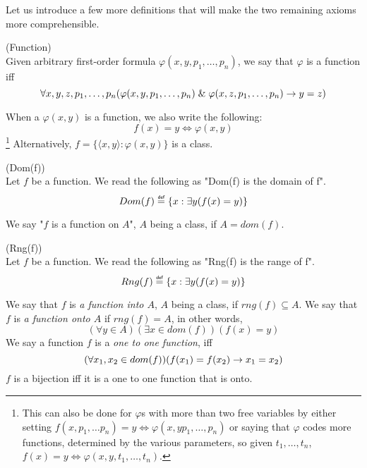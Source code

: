 Let us introduce a few more definitions that will make the two remaining axioms more comprehensible.
\begin{definition}{(Function)}\label{def:function}\\
Given arbitrary first-order formula $\varphi(x, y, p_1, \ldots, p_n)$, we say that $\varphi$ is a function iff
\begin{equation}\label{def:function_formula}
\forall x, y, z, p_1, \ldots, p_n (\varphi(x, y, p_1, \ldots, p_n) \mathrel{\&} \varphi(x, z, p_1, \ldots, p_n) \rightarrow y = z)
\end{equation}
\end{definition}
When a $\varphi(x, y)$ is a function, we also write the following:
\begin{equation}
f(x) = y \iff \varphi(x, y)
\end{equation}
\footnote{This can also be done for $\varphi$s with more than two free variables by either setting $f(x, p_1, \ldots p_n) = y \iff \varphi(x, y p_1, \ldots, p_n)$ or saying that $\varphi$ codes more functions, determined by the various parameters, so given $t_1, \ldots, t_n$, $f(x) = y \iff \varphi(x, y, t_1, \ldots, t_n)$.}
Alternatively, $f = \{\langle x, y \rangle : \varphi(x, y)\}$ is a class.


\begin{definition}{(Dom(f))}\label{def:dom}\\
Let $f$ be a function. We read the following as "Dom(f) is the domain of f".
\begin{equation}
Dom(f) \defeq \{x : \exists y (f(x) = y)\}
\end{equation}
\end{definition}
We say "$f$ is a function on $A$", $A$ being a class, if $A = dom(f)$.

\begin{definition}{(Rng(f))}\label{def:rng}\\
Let $f$ be a function. We read the following as "Rng(f) is the range of f".
\begin{equation}
Rng(f) \defeq \{x : \exists y (f(x) = y)\}
\end{equation}
\end{definition}
We say that $f$ is \emph{a function into $A$}, $A$ being a class, if $rng(f) \subseteq A$.
We say that $f$ is \emph{a function onto $A$} if $rng(f) = A$, in other words,
\begin{equation}
(\forall y \in A)(\exists x \in dom(f))(f(x) = y)
\end{equation}
We say a function $f$ is a \emph{one to one function}, iff
\begin{equation}
(\forall x_1, x_2 \in dom(f))(f(x_1) = f(x_2) \rightarrow x_1 = x_2)
\end{equation}
$f$ is a bijection iff it is a one to one function that is onto.

